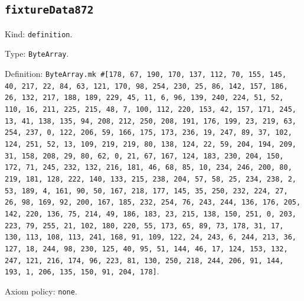 \documentclass[11pt]{article}
\begin{document}
\subsection*{\texttt{fixtureData872}}
\noindent Kind: \texttt{definition}.\par
\noindent Type: \texttt{ByteArray}.\par
\noindent Definition: \texttt{ByteArray.mk \#[178, 67, 190, 170, 137, 112, 70, 155, 145, 40, 217, 22, 84, 63, 121, 170, 98, 254, 230, 25, 86, 142, 157, 186, 26, 132, 217, 188, 189, 229, 45, 11, 6, 96, 139, 240, 224, 51, 52, 110, 16, 211, 225, 215, 48, 7, 100, 112, 220, 153, 42, 157, 171, 245, 13, 41, 138, 135, 94, 208, 212, 250, 208, 191, 176, 199, 23, 219, 63, 254, 237, 0, 122, 206, 59, 166, 175, 173, 236, 19, 247, 89, 37, 102, 124, 251, 52, 13, 109, 219, 219, 80, 138, 124, 22, 59, 204, 194, 209, 31, 158, 208, 29, 80, 62, 0, 21, 67, 167, 124, 183, 230, 204, 150, 172, 71, 245, 232, 132, 216, 181, 46, 68, 85, 10, 234, 246, 200, 80, 219, 181, 128, 222, 140, 133, 215, 238, 204, 57, 58, 25, 234, 238, 2, 53, 189, 4, 161, 90, 50, 167, 218, 177, 145, 35, 250, 232, 224, 27, 26, 98, 169, 92, 200, 167, 185, 232, 254, 76, 243, 244, 136, 176, 205, 142, 220, 136, 75, 214, 49, 186, 183, 23, 215, 138, 150, 251, 0, 203, 223, 79, 255, 21, 102, 180, 220, 55, 173, 65, 89, 73, 178, 31, 17, 130, 113, 108, 113, 241, 168, 91, 109, 122, 24, 243, 6, 244, 213, 36, 127, 18, 244, 98, 230, 125, 40, 95, 51, 144, 46, 17, 124, 153, 132, 247, 121, 216, 174, 96, 223, 81, 130, 250, 218, 244, 206, 91, 144, 193, 1, 206, 135, 150, 91, 204, 178]}.\par
\noindent Axiom policy: \texttt{none}.\par
\end{document}
